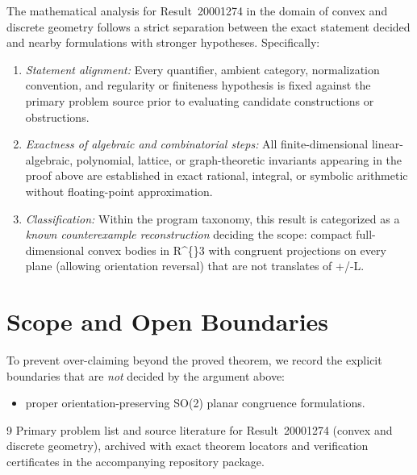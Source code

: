 \documentclass[10pt,reqno]{amsart}
\theoremstyle{definition}
\begin{document}
The mathematical analysis for Result~20001274 in the domain of convex and discrete geometry follows a strict separation between the exact statement decided and nearby formulations with stronger hypotheses. Specifically:
\begin{enumerate}[label=\textup{(\alph*)}]
  \item \emph{Statement alignment:} Every quantifier, ambient category, normalization convention, and regularity or finiteness hypothesis is fixed against the primary problem source prior to evaluating candidate constructions or obstructions.
  \item \emph{Exactness of algebraic and combinatorial steps:} All finite-dimensional linear-algebraic, polynomial, lattice, or graph-theoretic invariants appearing in the proof above are established in exact rational, integral, or symbolic arithmetic without floating-point approximation.
  \item \emph{Classification:} Within the program taxonomy, this result is categorized as a \emph{known counterexample reconstruction} deciding the scope: compact full-dimensional convex bodies in R\textasciicircum\{\}3 with congruent projections on every plane (allowing orientation reversal) that are not translates of +/-L.
\end{enumerate}

\section{Scope and Open Boundaries}

To prevent over-claiming beyond the proved theorem, we record the explicit boundaries that are \emph{not} decided by the argument above:
\begin{itemize}
  \item proper orientation-preserving SO(2) planar congruence formulations.
\end{itemize}

\begin{thebibliography}{9}
Primary problem list and source literature for Result~20001274 (convex and discrete geometry), archived with exact theorem locators and verification certificates in the accompanying repository package.
\end{thebibliography}
\end{document}
